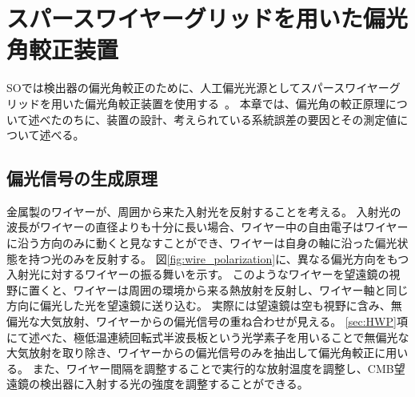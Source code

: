 \documentclass[../../main.tex]{subfiles}
\begin{document}
\chapter{スパースワイヤーグリッドを用いた偏光角較正装置}
\label{chap:wiregrid}
SOでは検出器の偏光角較正のために、人工偏光光源としてスパースワイヤーグリッドを用いた偏光角較正装置を使用する~\cite{swg:Murata_2023}。
本章では、偏光角の較正原理について述べたのちに、装置の設計、考えられている系統誤差の要因とその測定値について述べる。

\section{偏光信号の生成原理}
\label{sec:wiregrid_principle}
金属製のワイヤーが、周囲から来た入射光を反射することを考える。
入射光の波長がワイヤーの直径よりも十分に長い場合、ワイヤー中の自由電子はワイヤーに沿う方向のみに動くと見なすことができ、ワイヤーは自身の軸に沿った偏光状態を持つ光のみを反射する。
図\ref{fig:wire_polarization}に、異なる偏光方向をもつ入射光に対するワイヤーの振る舞いを示す。
このようなワイヤーを望遠鏡の視野に置くと、ワイヤーは周囲の環境から来る熱放射を反射し、ワイヤー軸と同じ方向に偏光した光を望遠鏡に送り込む。
実際には望遠鏡は空も視野に含み、無偏光な大気放射、ワイヤーからの偏光信号の重ね合わせが見える。
\ref{sec:HWP}項にて述べた、極低温連続回転式半波長板という光学素子を用いることで無偏光な大気放射を取り除き、ワイヤーからの偏光信号のみを抽出して偏光角較正に用いる。
また、ワイヤー間隔を調整することで実行的な放射温度を調整し、CMB望遠鏡の検出器に入射する光の強度を調整することができる。
\end{document}
